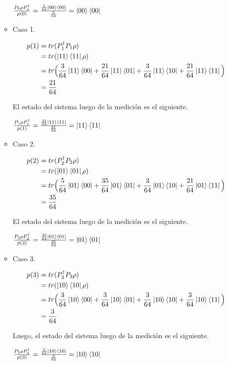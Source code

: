 \documentclass[a4paper,11pt]{article}
\begin{document}
\begin{enumerate}[label=\alph*)]
\begin{itemize}
  $\frac{P_0 \rho P_{0}^{\dag}}{p(0)} = \frac{\frac{5}{64} \ket{00}\bra{00}}{\frac{5}{64}} = \ket{00}\bra{00}$

\item Caso 1.

  \begin{align*}
    p(1)
    &= tr( P_1^{\dag} P_1 \rho )
    \\ &=  tr( \ket{11}\bra{11} \rho )
    \\ &= tr \Big( \frac{3}{64}\ket{11}\bra{00} + \frac{21}{64} \ket{11}\bra{01} + \frac{3}{64} \ket{11}\bra{10} + 
         \frac{21}{64}\ket{11}\bra{11} \Big)
    \\ &= \frac{21}{64}
  \end{align*}

  El estado del sistema luego de la medición es el siguiente.

  $\frac{P_1 \rho P_{1}^{\dag}}{p(1)} = \frac{\frac{21}{64} \ket{11}\bra{11}}{\frac{21}{64}} = \ket{11}\bra{11}$
  
\item Caso 2.

  \begin{align*}
    p(2)
    &= tr( P_2^{\dag} P_2 \rho )
    \\ &=  tr( \ket{01}\bra{01} \rho )
    \\ &= tr \Big( \frac{5}{64}\ket{01}\bra{00} + \frac{35}{64} \ket{01}\bra{01} + \frac{3}{64} \ket{01}\bra{10} + 
         \frac{21}{64}\ket{01}\bra{11} \Big)
    \\ &= \frac{35}{64}
  \end{align*}

  El estado del sistema luego de la medición es el siguiente.

  $\frac{P_2 \rho P_{2}^{\dag}}{p(2)} = \frac{\frac{35}{64} \ket{01}\bra{01}}{\frac{35}{64}} = \ket{01}\bra{01}$

\item Caso 3.

  \begin{align*}
    p(3)
    &= tr( P_3^{\dag} P_3 \rho )
    \\ &=  tr( \ket{10}\bra{10} \rho )
    \\ &= tr \Big( \frac{3}{64}\ket{10}\bra{00} + \frac{3}{64} \ket{10}\bra{01} + \frac{3}{64} \ket{10}\bra{10} + 
         \frac{3}{64}\ket{10}\bra{11} \Big)
    \\ &= \frac{3}{64}
  \end{align*}

  Luego, el estado del sistema luego de la medición es el siguiente.

  $\frac{P_3 \rho P_{3}^{\dag}}{p(3)} = \frac{\frac{3}{64} \ket{10}\bra{10}}{\frac{3}{64}} = \ket{10}\bra{10}$

\end{itemize}

\end{enumerate}
\end{document}

